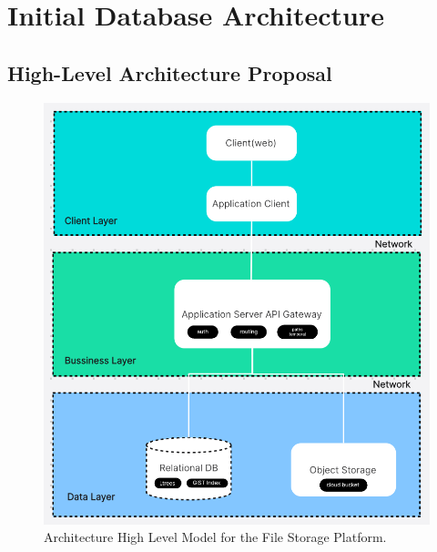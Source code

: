 \section{Initial Database Architecture}
\subsection{High-Level Architecture Proposal}

\begin{figure}[H]
    \centering
    \includegraphics[width=\linewidth,height=0.4\textheight,keepaspectratio]{initialdbarch/architecture_diagram.png}
    \caption{Architecture High Level Model for the File Storage Platform.}
    \label{fig:architecture_diagram}
\end{figure}
